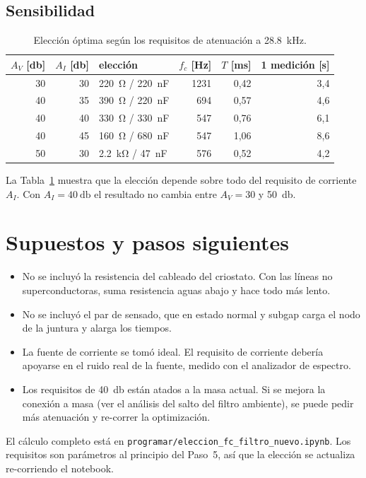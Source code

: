 \documentclass[11pt,a4paper]{article}
\begin{document}
\subsection*{Sensibilidad}

\begin{table}[h]
\centering
\caption{Elección óptima según los requisitos de atenuación a \SI{28.8}{\kilo\hertz}.}
\label{tab:sens}
\begin{tabular}{rrlrrr}
\toprule
$A_V$ [\si{\decibel}] & $A_I$ [\si{\decibel}] & elección & $f_c$ [\si{\hertz}] &
$T$ [\si{\milli\second}] & 1 medición [\si{\second}] \\
\midrule
30 & 30 & \SI{220}{\ohm} / \SI{220}{\nano\farad} & 1231 & 0,42 & 3,4 \\
40 & 35 & \SI{390}{\ohm} / \SI{220}{\nano\farad} &  694 & 0,57 & 4,6 \\
40 & 40 & \SI{330}{\ohm} / \SI{330}{\nano\farad} &  547 & 0,76 & 6,1 \\
40 & 45 & \SI{160}{\ohm} / \SI{680}{\nano\farad} &  547 & 1,06 & 8,6 \\
50 & 30 & \SI{2.2}{\kilo\ohm} / \SI{47}{\nano\farad} & 576 & 0,52 & 4,2 \\
\bottomrule
\end{tabular}
\end{table}

La Tabla~\ref{tab:sens} muestra que la elección depende sobre todo del requisito de corriente
$A_I$. Con $A_I = \SI{40}{\decibel}$ el resultado no cambia entre $A_V = 30$ y \SI{50}{\decibel}.

\section{Supuestos y pasos siguientes}

\begin{itemize}
  \item No se incluyó la resistencia del cableado del criostato. Con las líneas no
  superconductoras, suma resistencia aguas abajo y hace todo más lento.
  \item No se incluyó el par de sensado, que en estado normal y subgap carga el nodo de la
  juntura y alarga los tiempos.
  \item La fuente de corriente se tomó ideal. El requisito de corriente debería apoyarse en el
  ruido real de la fuente, medido con el analizador de espectro.
  \item Los requisitos de \SI{40}{\decibel} están atados a la masa actual. Si se mejora la
  conexión a masa (ver el análisis del salto del filtro ambiente), se puede pedir más atenuación y
  re-correr la optimización.
\end{itemize}

El cálculo completo está en \texttt{programar/eleccion\_fc\_filtro\_nuevo.ipynb}. Los requisitos
son parámetros al principio del Paso~5, así que la elección se actualiza re-corriendo el notebook.
\end{document}
